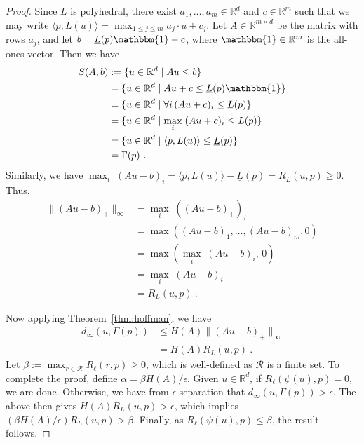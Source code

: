 \documentclass[12pt]{article}
\newcommand{\reals}{\mathbb{R}}
\newcommand{\R}{\mathcal{R}}
\newcommand{\risk}[1]{\underline{#1}}
\newcommand{\inprod}[2]{\langle #1, #2 \rangle}%
\newcommand{\ones}{\mathbbm{1}}
\newcommand{\regret}[3]{R_{#1}(#2,#3)}
\begin{document}
\begin{proof}
  Since $L$ is polyhedral, there exist $a_1,\ldots,a_m \in \reals^d$ and $c\in\reals^m$ such that we may write $\inprod{p}{L(u)} = \max_{1\leq j\leq m} a_j \cdot u + c_j$.
  Let $A \in \reals^{m\times d}$ be the matrix with rows $a_j$, and let $b = \risk{L}(p)\ones - c$, where $\ones\in\reals^m$ is the all-ones vector.
  Then we have
  \begin{align*}
    S(A,b)
    &:= \{u\in\reals^d \mid A u \leq b\}
    \\
    &= \{u\in\reals^d \mid A u + c \leq \risk{L}(p)\ones\}
    \\
    &= \{u\in\reals^d \mid \forall i\, (A u + c)_i \leq \risk{L}(p)\}
    \\
    &= \{u\in\reals^d \mid \max_i \;(A u + c)_i \leq \risk{L}(p)\}
    \\
    &= \{u\in\reals^d \mid \inprod{p}{L(u)} \leq \risk{L}(p)\}
    \\
    & = \Gamma(p)~.
  \end{align*}
  Similarly, we have $\max_i\; (A u - b)_i = \inprod{p}{L(u)} - \risk{L}(p) = \regret{L}{u}{p} \geq 0$.
  Thus,
  \begin{align*}
    \|(Au - b)_+\|_\infty
    &= \max_i\; ((Au - b)_+)_i
    \\
    &= \max((Au - b)_1,\ldots,(Au - b)_m, 0)
    \\
    &= \max(\max_i\; (Au - b)_i, \, 0)
    \\
    &= \max_i\; (Au - b)_i
    \\
    &= \regret{L}{u}{p}~.
  \end{align*}

  Now applying Theorem~\ref{thm:hoffman}, we have
  \begin{align*}
    d_\infty(u,\Gamma(p))
    &\leq H(A) \|(Au-b)_+\|_\infty
    \\
    &= H(A) \regret{L}{u}{p}~.
  \end{align*}
  Let $\beta := \max_{r\in\R} \regret{\ell}{r}{p}\geq 0$, which is well-defined as $\R$ is a finite set.
  To complete the proof, define $\alpha = \beta H(A)/\epsilon$.
  Given $u\in\reals^d$, if $\regret{\ell}{\psi(u)}{p} = 0$, we are done.
  Otherwise, we have from $\epsilon$-separation that $d_\infty(u,\Gamma(p)) > \epsilon$.
  The above then gives $H(A) \regret{L}{u}{p} > \epsilon$, which implies
  $(\beta H(A) / \epsilon) \regret{L}{u}{p} > \beta$.
  Finally, as $\regret{\ell}{\psi(u)}{p} \leq \beta$, the result follows.
\end{proof}
\end{document}
